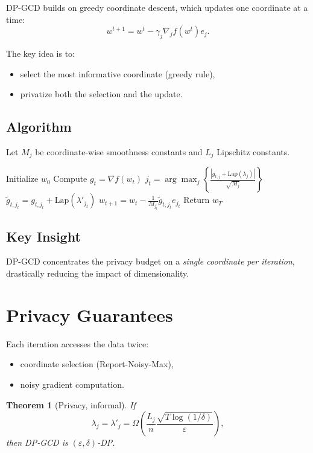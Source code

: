 \documentclass[11pt,a4paper]{article}
\newtheorem{theorem}{Theorem}
\begin{document}
DP-GCD builds on greedy coordinate descent, which updates one coordinate at a time:
\[
w^{t+1} = w^t - \gamma_j \nabla_j f(w^t) e_j.
\]

The key idea is to:
\begin{itemize}
\item select the most informative coordinate (greedy rule),
\item privatize both the selection and the update.
\end{itemize}

\subsection{Algorithm}

Let $M_j$ be coordinate-wise smoothness constants and $L_j$ Lipschitz constants.

\begin{algorithm}[h]
\caption{DP-GCD}
\begin{algorithmic}[1]
\State Initialize $w_0$
    \State Compute $g_t = \nabla f(w_t)$
    \State $j_t = \arg\max_j \left\{ \frac{|g_{t,j}+ \text{Lap}(\lambda_j) | }{\sqrt{M_j}}  \right\}$
    \State $\tilde{g}_{t,j_t} = g_{t,j_t} + \text{Lap}(\lambda'_{j_t})$
    \State $w_{t+1} = w_t - \frac{1}{M_{j_t}} \tilde{g}_{t,j_t} e_{j_t}$
\EndFor
\State Return $w_T$
\end{algorithmic}
\end{algorithm}

\subsection{Key Insight}

DP-GCD concentrates the privacy budget on a \emph{single coordinate per iteration}, drastically reducing the impact of dimensionality.

\section{Privacy Guarantees}

Each iteration accesses the data twice:
\begin{itemize}
\item coordinate selection (Report-Noisy-Max),
\item noisy gradient computation.
\end{itemize}

\begin{theorem}[Privacy, informal]
If
\[
\lambda_j = \lambda'_j = \Omega\left(\frac{L_j}{n} \frac{\sqrt{T \log(1/\delta)}}{\varepsilon}\right),
\]
then DP-GCD is $(\varepsilon, \delta)$-DP.
\end{theorem}
\end{document}
